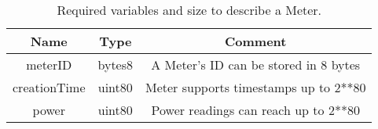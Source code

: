 \begin{table}[htb]
	\centering
	\vspace*{-1ex}
	\scriptsize
	\vspace{-1ex}
	\caption{Required variables and size to describe a Meter.}
	\begin{tabular}{|c|c|c|}
        \hline
        \textbf{Name} & \textbf{Type}  & \textbf{Comment}\\ \hline 
        meterID      & bytes8         & A Meter's ID can be stored in 8 bytes\\
        creationTime  & uint80         & Meter supports timestamps up to 2**80 \\
        power         & uint80          & Power readings can reach up to 2**80 \\
        \hline
    \end{tabular}
    \label{table:meter}
\end{table}